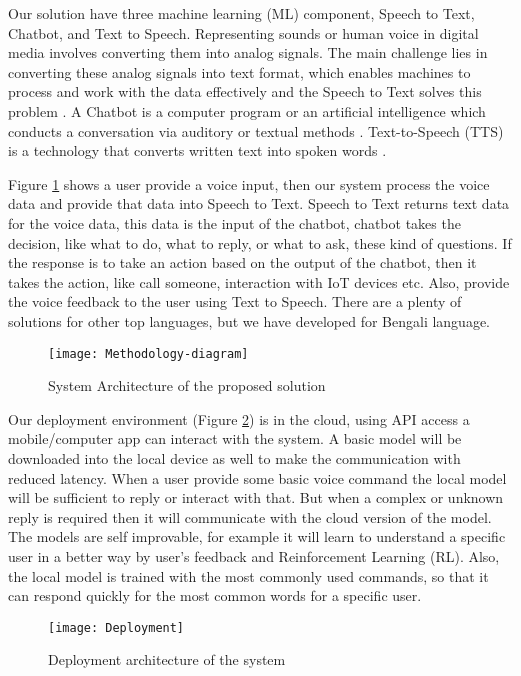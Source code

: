 Our solution have three machine learning (ML) component, Speech to Text, Chatbot, and Text to Speech.
Representing sounds or human voice in digital media involves converting them into analog signals.
The main challenge lies in converting these analog signals into text format, which enables machines to process and work with the data effectively and the Speech to Text solves this problem \cite{speech-recog-bengali}.
A Chatbot is a computer program or an artificial intelligence which conducts a conversation via auditory or textual methods \cite{chatbot}.
Text-to-Speech (TTS) is a technology that converts written text into spoken words \cite{text-to-speech}.

Figure  \ref{fig:methodology} shows a user provide a voice input, then our system process the voice data and provide that data into Speech to Text.
Speech to Text returns text data for the voice data, this data is the input of the chatbot, chatbot takes the decision, like what to do, what to reply, or what to ask, these kind of questions.
If the response is to take an action based on the output of the chatbot, then it takes the action, like call someone, interaction with IoT devices etc.
Also, provide the voice feedback to the user using Text to Speech.
There are a plenty of solutions for other top languages, but we have developed for Bengali language.

\begin{figure}
    \centering
    \texttt{[image: Methodology-diagram]}
    \caption{System Architecture of the proposed solution}\label{fig:methodology}
\end{figure}

Our deployment environment (Figure \ref{fig:deployment}) is in the cloud, using API access a mobile/computer app can interact with the system.
A basic model will be downloaded into the local device as well to make the communication with reduced latency.
When a user provide some basic voice command the local model will be sufficient to reply or interact with that.
But when a complex or unknown reply is required then it will communicate with the cloud version of the model.
The models are self improvable, for example it will learn to understand a specific user in a better way by user's feedback and Reinforcement Learning (RL).
Also, the local model is trained with the most commonly used commands, so that it can respond quickly for the most common words for a specific user.

\begin{figure}
    \centering
    \texttt{[image: Deployment]}
    \caption{Deployment architecture of the system}\label{fig:deployment}
\end{figure}
